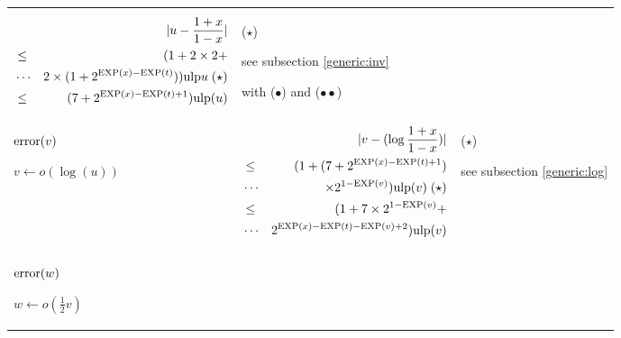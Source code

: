 \documentclass[12pt]{amsart}
\def\ulp{{\rm ulp}}
\def\Exp{{\rm EXP}}
\begin{document}
\begin{center}
\begin{tabular}{l l l}
\begin{minipage}{7.5cm}
\begin{eqnarray}\nonumber
  &&|u-\frac{1+x}{1-x}| \\\nonumber
  &       \leq& (1+ 2 \times 2 + \\\nonumber
  &       \cdots& 2 \times (1+2^{\Exp(x)-\Exp(t)}))\ulp{u} \;(\star)\\\nonumber
  &       \leq& (7+2^{\Exp(x)-\Exp(t)+1})\ulp(u)
\end{eqnarray}


\end{minipage} &
\begin{minipage}{6cm}

($\star$)

see subsection \ref{generic:inv}

with ($\bullet$) and ($\bullet\bullet$)

\end{minipage}\\%
\begin{minipage}{2.5cm}
${\textnormal{error}}(v)$


$v \leftarrow o(\log(u)) $


\end{minipage} &
\begin{minipage}{7.5cm}

\begin{eqnarray}\nonumber
  &&|v-(\log{\frac{1+x}{1-x}})| \\\nonumber
  &       \leq& (1+(7+2^{\Exp(x)-\Exp(t)+1}) \\\nonumber
  &       \cdots&  \times 2^{1-\Exp(v)}) \ulp(v)\;(\star)\\\nonumber
  &       \leq& (1+7 \times 2^{1-\Exp(v)} +\\\nonumber
  &       \cdots&  2^{\Exp(x)-\Exp(t)-\Exp(v)+2}) \ulp(v) 
\end{eqnarray}


\end{minipage} &
\begin{minipage}{6cm}

($\star$)

see subsection \ref{generic:log}

\end{minipage}\\%
\begin{minipage}{2.5cm}
${\textnormal{error}}(w)$


$w \leftarrow o(\frac{1}{2} v) $
\end{minipage} &
\begin{minipage}{7.5cm}


\end{minipage}
\end{tabular}
\end{center}
\end{document}
